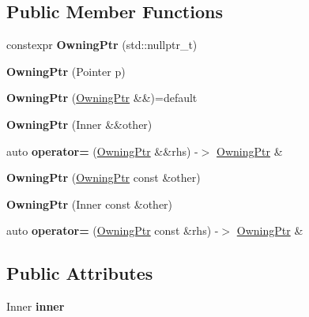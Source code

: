 \subsection*{Public Member Functions}
\begin{DoxyCompactItemize}
\item 
\mbox{\label{structOwningPtr_adbb53c4a73964a43c4483079e3a81a58}} 
constexpr {\bfseries Owning\+Ptr} (std\+::nullptr\+\_\+t)
\item 
\mbox{\label{structOwningPtr_a448f31015c5de294bf6abccebc6a9815}} 
{\bfseries Owning\+Ptr} (Pointer p)
\item 
\mbox{\label{structOwningPtr_ab8df796c4042fcc3e4d074449c3db56b}} 
{\bfseries Owning\+Ptr} (\mbox{\hyperlink{structOwningPtr}{Owning\+Ptr}} \&\&)=default
\item 
\mbox{\label{structOwningPtr_a17b0b986617990da45f9589f4eb3a289}} 
{\bfseries Owning\+Ptr} (Inner \&\&other)
\item 
\mbox{\label{structOwningPtr_a7c03786b2b6842e37b35aee4d2e2a5f1}} 
auto {\bfseries operator=} (\mbox{\hyperlink{structOwningPtr}{Owning\+Ptr}} \&\&rhs) -\/$>$ \mbox{\hyperlink{structOwningPtr}{Owning\+Ptr}} \&
\item 
\mbox{\label{structOwningPtr_a0ff1dddf9d85640a5b61e138694c2a52}} 
{\bfseries Owning\+Ptr} (\mbox{\hyperlink{structOwningPtr}{Owning\+Ptr}} const \&other)
\item 
\mbox{\label{structOwningPtr_a8508c230748eab20127521584348cb35}} 
{\bfseries Owning\+Ptr} (Inner const \&other)
\item 
\mbox{\label{structOwningPtr_a1ab68b0a404225c64fa4d85dd10955dc}} 
auto {\bfseries operator=} (\mbox{\hyperlink{structOwningPtr}{Owning\+Ptr}} const \&rhs) -\/$>$ \mbox{\hyperlink{structOwningPtr}{Owning\+Ptr}} \&
\end{DoxyCompactItemize}
\subsection*{Public Attributes}
\begin{DoxyCompactItemize}
\item 
\mbox{\label{structOwningPtr_a8969ca5cf7352c35d56cccd60c183c88}} 
Inner {\bfseries inner}
\end{DoxyCompactItemize}


